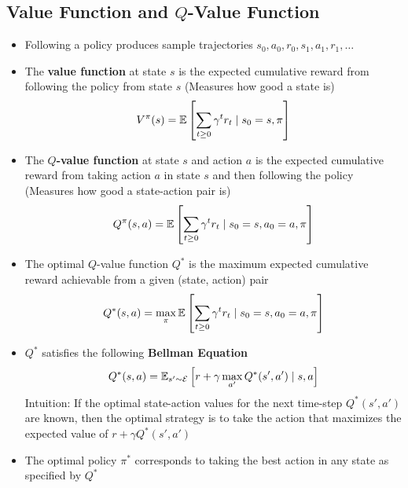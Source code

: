 \subsection{Value Function and $Q$-Value Function}
\begin{itemize}
	\item Following a policy produces sample trajectories $s_0, a_0, r_0, s_1, a_1, r_1, \dots$
	\item The \textbf{value function} at state $s$ is the expected cumulative reward from following the policy from state $s$ (Measures how good a state is)
	$$V^\pi (s) = \mathbb{E}\left[\sum_{t\geq 0} \gamma^t r_t\mid s_0 = s, \pi\right]$$
	\item The \textbf{$Q$-value function} at state $s$ and action $a$ is the expected cumulative reward from taking action $a$ in state $s$ and then following the policy (Measures how good a state-action pair is)
	$$Q^\pi (s, a) = \mathbb{E}\left[\sum_{t\geq 0} \gamma^tr_t\mid s_0=s, a_0=a, \pi\right]$$
	\item The optimal $Q$-value function $Q^\ast$ is the maximum expected cumulative reward achievable from a given (state, action) pair
	$$Q^\ast (s, a) = \max_{\pi}\mathbb{E}\left[\sum_{t\geq 0} \gamma^tr_t\mid s_0=s, a_0=a, \pi\right]$$
	\item $Q^\ast$ satisfies the following \textbf{Bellman Equation}
	$$Q^\ast (s, a) = \mathbb{E}_{s'\sim \mathcal{E}}\left[r + \gamma \max_{a'} Q^\ast (s', a') \mid s, a\right]$$
	Intuition: If the optimal state-action values for the next time-step $Q^\ast (s', a')$ are known, then the optimal strategy is to take the action that maximizes the expected value of $r+\gamma Q^\ast (s', a')$
	\item The optimal policy $\pi^\ast$ corresponds to taking the best action in any state as specified by $Q^\ast$
\end{itemize}

